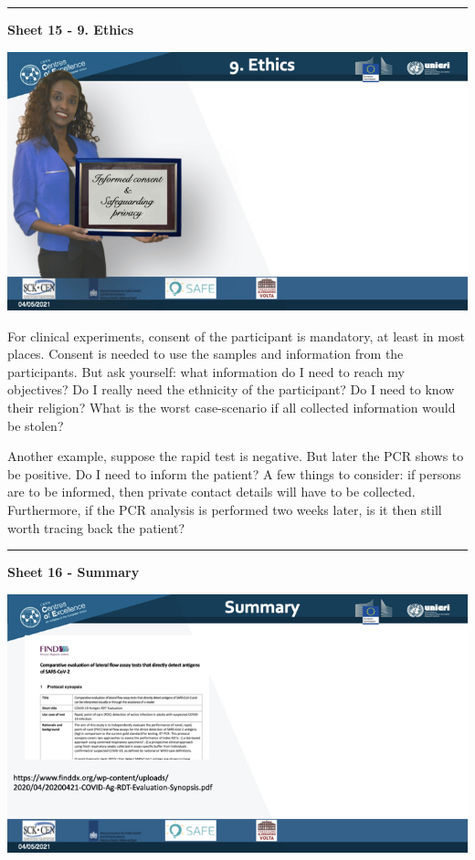 \documentclass[
]{book}
\begin{document}
\begin{center}\rule{0.5\linewidth}{0.5pt}\end{center}

\textbf{Sheet 15 - 9. Ethics}

\includegraphics{images/m03/m03_validation_of_test_kits_v2_2.015.jpeg}

For clinical experiments, consent of the participant is mandatory, at
least in most places. Consent is needed to use the samples and
information from the participants. But ask yourself: what information do
I need to reach my objectives? Do I really need the ethnicity of the
participant? Do I need to know their religion? What is the worst
case-scenario if all collected information would be stolen?

Another example, suppose the rapid test is negative. But later the PCR
shows to be positive. Do I need to inform the patient? A few things to
consider: if persons are to be informed, then private contact details
will have to be collected. Furthermore, if the PCR analysis is performed
two weeks later, is it then still worth tracing back the patient?

\begin{center}\rule{0.5\linewidth}{0.5pt}\end{center}

\textbf{Sheet 16 - Summary}

\includegraphics{images/m03/m03_validation_of_test_kits_v2_2.016.jpeg}
\end{document}
